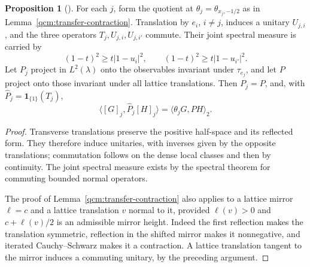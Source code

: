 \documentclass[11pt,letterpaper,reqno]{amsart}
\theoremstyle{definition}
\newtheorem{qcmproposition}{Proposition}[section]
\newenvironment{proposition}[1][]{\pushQED{\qed}\renewcommand{\qedsymbol}{$\blacksquare$}\begin{qcmproposition}[#1]}{\popQED\end{qcmproposition}}
\begin{document}
\begin{proposition}\label{qcm:lattice-cone}
For each $j$, form the quotient at
$\theta_j=\theta_{x_j,-1/2}$ as in
Lemma~\ref{qcm:transfer-contraction}. Translation by $e_i$, $i\ne j$,
induces a unitary $U_{j,i}$, and the three operators
$T_j,U_{j,i},U_{j,i'}$ commute. Their joint spectral measure is
carried by
\[
 (1-t)^2\ge t|1-u_i|^2,\qquad
 (1-t)^2\ge t|1-u_{i'}|^2.
\]
Let $P_j$ project in $L^2(\lambda)$ onto the observables invariant
under $\tau_{e_j}$, and let $P$ project onto those invariant under
all lattice translations. Then $P_j=P$, and, with
$\widehat P_j=\mathbf1_{\{1\}}(T_j)$,
\[
 \langle[G]_j,\widehat P_j[H]_j\rangle
       =\langle\theta_jG,P H\rangle_2.
\]
\end{proposition}

\begin{proof}
Transverse translations preserve the positive half-space and its
reflected form. They therefore induce unitaries, with inverses
given by the opposite translations; commutation follows on the
dense local classes and then by continuity. The joint spectral
measure exists by the spectral theorem for commuting bounded
normal operators.

The proof of Lemma~\ref{qcm:transfer-contraction} also applies to a
lattice mirror $\ell=c$ and a lattice translation $v$ normal to it,
provided $\ell(v)>0$ and $c+\ell(v)/2$ is an admissible mirror
height. Indeed the first reflection makes the translation symmetric,
reflection in the shifted mirror makes it nonnegative, and iterated
Cauchy--Schwarz makes it a contraction. A lattice translation tangent
to the mirror induces a commuting unitary, by the preceding argument.


\end{proof}
\end{document}
